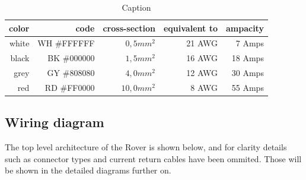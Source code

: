     \begin{table}[h]
        \centering
        \begin{tabular}{|r|r|r|r|r|} \hline 
          color\footnotemark[1]& code\footnotemark[2]& cross-section\footnotemark[3]&  equivalent to\footnotemark[4]& ampacity\footnotemark[5] \\ \hline 
                          white&          WH \#FFFFFF&                    $0,5mm^2$&                          21 AWG&                7 Amps    \\ \hline 
                          black&          BK \#000000&                    $1,5mm^2$&                          16 AWG&               18 Amps    \\ \hline 
                           grey&          GY \#808080&                    $4,0mm^2$&                          12 AWG&               30 Amps    \\ \hline 
                            red&          RD \#FF0000&                   $10,0mm^2$&                           8 AWG&               55 Amps    \\ \hline
        \end{tabular}
        \caption{Caption}
        \label{color_codes}
    \end{table}

    

    
    \clearpage

    \subsection{Wiring diagram}

    The top level architecture of the Rover is shown below, and for clarity details such as connector types and current return cables have been ommited. Those will be shown in the detailed diagrams further on. 

